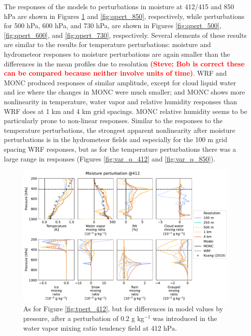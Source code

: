 \documentclass[draft]{agujournal2019}
\newcommand{\todo}[1]{\textcolor{red}{\textbf{(#1)}}}
\begin{document}
The responses of the models to perturbations in moisture at 412/415 and 850 hPa
are shown in Figures \ref{fig:qpert_412} and \ref{fig:qpert_850}, respectively,
while perturbations for 500 hPa, 600 hPa, and 730 hPa, are shown in Figures
\ref{fig:qpert_500}, \ref{fig:qpert_600}, and \ref{fig:qpert_730}, respectively.
Several elements of these results are similar to the results for temperature
perturbations: moisture and hydrometeor responses to moisture perturbations are
again smaller than the differences in the mean profiles due to resolution
\todo{Steve: Bob is correct these can be compared because neither involve units
of time}. WRF and MONC produced responses of similar amplitude, except for cloud
liquid water and ice where the changes in MONC were much smaller; and MONC shows
more nonlinearity in temperature, water vapor and relative humidity responses
than WRF does at 1 km and 4 km grid spacings. MONC relative humidity seems to be
particularly prone to non-linear responses. Similar to the responses to the
temperature perturbations, the strongest apparent nonlinearity after moisture
perturbations is in the hydrometeor fields and especially for the 100 m grid
spacing WRF responses, but as for the temperature perturbations there was a
large range in responses (Figures \ref{fig:var_q_412} and \ref{fig:var_q_850}).

\begin{figure}[pth]
    \noindent\includegraphics[width=\textwidth]{figures/pert_diffs_q_0.0002_@412}
    \caption{As for Figure \ref{fig:tpert_412}, but for differences in model
    values by pressure, after a perturbation of 0.2 g kg$^{-1}$ was introduced
    in the water vapor mixing ratio tendency field at 412 hPa.}
    \label{fig:qpert_412}
\end{figure}
\end{document}
